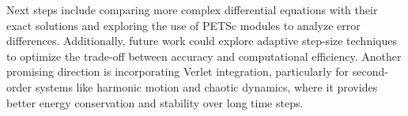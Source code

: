 \documentclass{article}
\begin{document}
Next steps include comparing more complex differential equations with their exact solutions and exploring the use of PETSc modules to analyze error differences. Additionally, future work could explore adaptive step-size techniques to optimize the trade-off between accuracy and computational efficiency. Another promising direction is incorporating Verlet integration, particularly for second-order systems like harmonic motion and chaotic dynamics, where it provides better energy conservation and stability over long time steps.
\end{document}
